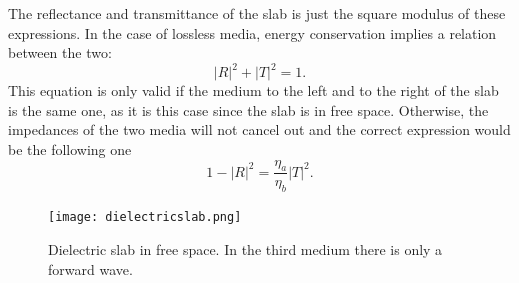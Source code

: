 \documentclass[12pt, oneside]{book}
\begin{document}
\indent The reflectance and transmittance of the slab is just the square modulus of these expressions. In the case of lossless media, energy conservation implies a relation between the two:
\begin{equation}\label{r2+t21}
\left|R\right|^{2} + |T|^{2}= 1.
\end{equation}
This equation is only valid if the medium to the left and to the right of the slab is the same one, as it is this case since the slab is in free space. Otherwise, the impedances of the two media will not cancel out and the correct expression would be the following one
\begin{equation}
1-\left|R\right|^{2}=\frac{\eta_{a}}{\eta_{b}}|T|^{2}.
\end{equation}
 
\begin{figure}\label{dielectricslab}
\centering
\texttt{[image: dielectricslab.png]}
\caption{Dielectric slab in free space. In the third medium there is only a forward wave. \cite{orfanidis2002electromagnetic}}
\end{figure}
\end{document}
